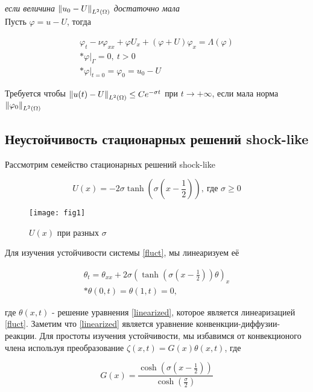 \textit{если величина} $\left\lVert u_0 - U\right\rVert_{L^2(\Omega)}$ \textit{достаточно мала}\\

Пусть $\varphi = u - U$, тогда

\begin{gather}\label{fluct}
    \varphi_t - \nu \varphi_{xx} + \varphi U_x + (\varphi + U)\varphi_x =
    \Lambda(\varphi)\\* 
    \varphi|_{\Gamma} = 0, \ t > 0\\*
    \varphi|_{t = 0} = \varphi_0 = u_0 - U
\end{gather}

Требуется чтобы $\left\lVert u(t) - U\right\rVert_{L^2(\Omega)} \le C e^{-\sigma t}$ при $t \to
+\infty$, если мала норма $\left\lVert\varphi_0\right\rVert_{L^2(\Omega)}$

\subsection{Неустойчивость стационарных решений shock-like}

Рассмотрим семейство стационарных решений shock-like

\begin{equation}\label{shock_like}
    U(x) = -2\sigma\tanh{(\sigma(x - \frac{1}{2}))}, \ \text{где } \sigma \ge 0
\end{equation}

\begin{figure}[H]
    \centering
    \texttt{[image: fig1]}
    \caption{$U(x)$ при разных $\sigma$}
\end{figure}

Для изучения устойчивости системы \eqref{fluct}, мы линеаризуем её

\begin{gather}\label{linearized}
    \theta_t = \theta_{xx} + 2 \sigma (\tanh(\sigma(x - \frac{1}{2}))\theta)_x \\*
    \theta(0, t) = \theta(1, t) = 0,
\end{gather}

где $\theta(x, t)$ - решение уравнения \eqref{linearized}, которое является
линеаризацией \eqref{fluct}. Заметим что \eqref{linearized} является  уравнение 
конвенкции-диффузии-реакции. Для простоты изучения устойчивости, мы избавимся 
от конвекционого члена используя преобразование 
$\zeta(x, t) = G(x)\theta(x, t)$, где 

\begin{equation}
    G(x) = \frac{\cosh(\sigma(x - \frac{1}{2}))}{\cosh(\frac{\sigma}{2})}
\end{equation} 

